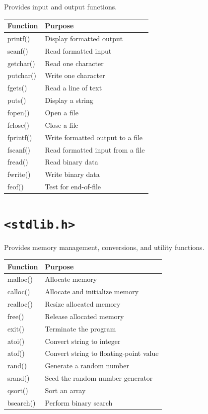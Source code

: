 \documentclass[12pt,openany]{book}
\begin{document}
Provides input and output functions.

\begin{center}
\begin{tabular}{|l|p{8cm}|}
\hline
Function & Purpose \\
\hline
printf() & Display formatted output \\
scanf() & Read formatted input \\
getchar() & Read one character \\
putchar() & Write one character \\
fgets() & Read a line of text \\
puts() & Display a string \\
fopen() & Open a file \\
fclose() & Close a file \\
fprintf() & Write formatted output to a file \\
fscanf() & Read formatted input from a file \\
fread() & Read binary data \\
fwrite() & Write binary data \\
feof() & Test for end-of-file \\
\hline
\end{tabular}
\end{center}

\section{\texttt{<stdlib.h>}}

Provides memory management, conversions, and utility functions.

\begin{center}
\begin{tabular}{|l|p{8cm}|}
\hline
Function & Purpose \\
\hline
malloc() & Allocate memory \\
calloc() & Allocate and initialize memory \\
realloc() & Resize allocated memory \\
free() & Release allocated memory \\
exit() & Terminate the program \\
atoi() & Convert string to integer \\
atof() & Convert string to floating-point value \\
rand() & Generate a random number \\
srand() & Seed the random number generator \\
qsort() & Sort an array \\
bsearch() & Perform binary search \\
\hline
\end{tabular}
\end{center}
\end{document}
